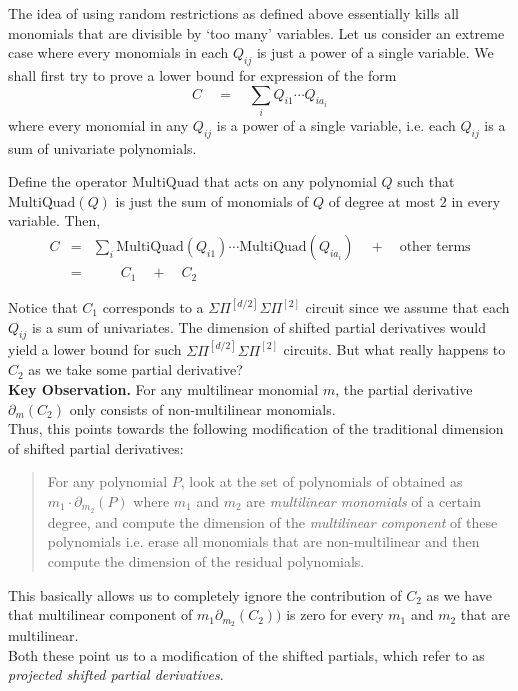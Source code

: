 \documentclass{beatcs}
\newcommand{\spaced}[1]{\quad#1\quad}
\newcommand{\SPSPfanin}[2]{\Sigma\Pi^{[#1]}\Sigma\Pi^{[#2]}}
\begin{document}
The idea of using random restrictions as defined above essentially kills all monomials that are divisible by `too many' variables. Let us consider an extreme case where every monomials in each $Q_{ij}$ is just a power of a single variable. We shall first try to prove a lower bound for expression of the form
\[
C\spaced{=} \sum_{i}Q_{i1}\cdots Q_{ia_i}
\]
where every monomial in any $Q_{ij}$ is a power of a single variable, i.e. each $Q_{ij}$ is a sum of univariate polynomials. 

Define the operator $\mathrm{MultiQuad}$ that acts on any polynomial $Q$ such that $\mathrm{MultiQuad}(Q)$ is just the sum of monomials of $Q$ of degree at most $2$ in every variable. Then,
\begin{eqnarray*}
C &=&  \sum_{i}\mathrm{MultiQuad}(Q_{i1})\cdots \mathrm{MultiQuad}(Q_{ia_i}) \spaced{+} \text{other terms}\\
  & = & \qquad C_1 \spaced{+} C_2
\end{eqnarray*}

Notice that $C_1$ corresponds to a $\SPSPfanin{d/2}{2}$ circuit since we assume that each $Q_{ij}$ is a sum of univariates. The dimension of shifted partial derivatives would yield a lower bound for such $\SPSPfanin{d/2}{2}$ circuits. But what really happens to $C_2$ as we take some partial derivative?\\

{\bf Key Observation. } For any multilinear monomial $m$, the partial derivative $\partial_m(C_2)$ only consists of non-multilinear monomials. \\

Thus, this points towards the following modification of the traditional dimension of shifted partial derivatives: 
\begin{quote}
  For any polynomial $P$, look at the set of polynomials of obtained as $m_1 \cdot \partial_{m_2}(P)$ where $m_1$ and $m_2$ are \emph{multilinear monomials} of a certain degree, and compute the dimension of the \emph{multilinear component} of these polynomials i.e. erase all monomials that are non-multilinear and then compute the dimension of the residual polynomials. 
\end{quote}
This basically allows us to completely ignore the contribution of $C_2$ as we have that multilinear component of $m_1 \partial_{m_2}(C_2))$ is zero for every $m_1$ and $m_2$ that are multilinear. \\


Both these point us to a modification of the shifted partials, which \cite{KLSS,KS14} refer to as \emph{projected shifted partial derivatives}. 
\end{document}
